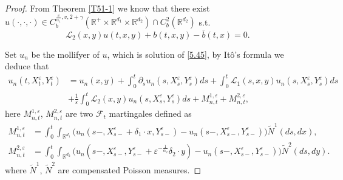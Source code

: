 \documentclass[11pt,reqno]{amsart}
\numberwithin{equation}{section}
\newcommand{\de}{\delta}
\newcommand{\mb}{\mathbb}
\begin{document}
\begin{proof}
From Theorem \ref{T51-1} we know that there exist  $ u(\cdot,\cdot,\cdot)\in C_{b}^{\frac{v}{\alpha_{1}},v,2+\gamma}(\mb{R}^{+}\times\mathbb{R}^{d_{1}}\times\mathbb{R}^{d_{2}})\cap C_b^{2}(\mathbb{R}^{d_{2}})$ s.t.
\begin{equation}\label{5.45}
	\mathcal{L}_{2}(x,y)u(t,x,y)+b(t,x,y)-\bar{b}(t,x)=0.
\end{equation}
	
	
	
Set $u_{n}$ be the mollifyer of $u$, which is solution of \eqref{5.45}, by It\^{o}'s formula we deduce that
\begin{align*}
	u_{n}(t,X_{t}^{\varepsilon},Y_{t}^{\varepsilon})
	&=u_{n}(x,y)+\int_{0}^{t}\partial_{s}u_{n}(s,X_{s}^{\varepsilon},Y_{s}^{\varepsilon})ds+\int_{0}^{t}\mathcal{L}_{1}(s,x,y)u_{n}(s,X_{s}^{\varepsilon},Y_{s}^{\varepsilon})ds\\
	&+\frac{1}{\varepsilon}\int_{0}^{t}\mathcal{L}_{2}(x,y)u_{n}(s,X_{s}^{\varepsilon},Y_{s}^{\varepsilon})ds+M_{n,t}^{1,\varepsilon}+M_{n,t}^{2,\varepsilon},
\end{align*}
here $M_{n,t}^{1,\varepsilon}$, $M_{n,t}^{2,\varepsilon}$ are two $ \mathcal{F}_{t}$ martingales defined as
\begin{align*} M_{n,t}^{1,\varepsilon}&=\int_{0}^{t}\int_{\mathbb{R}^{d_{1}}}\big(u_{n}(s-,X_{s-}^{\varepsilon}+\de_1\cdot  x,Y_{s-}^{\varepsilon})-u_{n}(s-,X_{s-}^{\varepsilon},Y_{s-}^{\varepsilon})\big)\tilde{N}^{1}(ds,dx),\\ M_{n,t}^{2,\varepsilon}&=\int_{0}^{t}\int_{\mathbb{R}^{d_{2}}}\big(u_{n}(s-,X_{s-}^{\varepsilon},Y_{s-}^{\varepsilon}+\varepsilon^{-\frac{1}{\alpha_{2}}}\de_2\cdot  y)-u_{n}(s-,X_{s-}^{\varepsilon},Y_{s-}^{\varepsilon})\big)\tilde{N}^{2}(ds,dy).
\end{align*}
where $\tilde{N}^{1}$, $\tilde{N}^{2}$ are compensated Poisson measures.


\end{proof}
\end{document}

